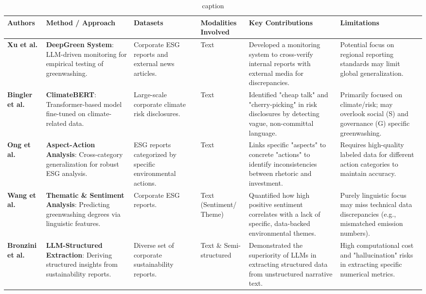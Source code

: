 \begin{landscape}
\begin{table}[p]
\centering
\caption{caption}
\label{label}
\small
\renewcommand{\arraystretch}{1.2}
\begin{tabularx}{\linewidth}{|p{1.8cm}|X|X|p{1.8cm}|X|X|}
\hline
Authors & Method / Approach & Datasets & Modalities Involved & Key Contributions & Limitations \\ \hline
\textbf{Xu et al.}  \parencite{chong_xu_bff21576} & \textbf{DeepGreen System}: LLM-driven monitoring for empirical testing of greenwashing. & Corporate ESG reports and external news articles. & Text & Developed a monitoring system to cross-verify internal reports with external media for discrepancies. & Potential focus on regional reporting standards may limit global generalization. \\ \hline
\textbf{Bingler et al.}  \parencite{julia_bingler_268445e3} & \textbf{ClimateBERT}: Transformer-based model fine-tuned on climate-related data. & Large-scale corporate climate risk disclosures. & Text & Identified "cheap talk" and "cherry-picking" in risk disclosures by detecting vague, non-committal language. & Primarily focused on climate/risk; may overlook social (S) and governance (G) specific greenwashing. \\ \hline
\textbf{Ong et al.}  \parencite{keane_ong_369a0b63} & \textbf{Aspect-Action Analysis}: Cross-category generalization for robust ESG analysis. & ESG reports categorized by specific environmental actions. & Text & Links specific "aspects" to concrete "actions" to identify inconsistencies between rhetoric and investment. & Requires high-quality labeled data for different action categories to maintain accuracy. \\ \hline
\textbf{Wang et al.}  \parencite{xiaojia_wang_02351a60} & \textbf{Thematic \& Sentiment Analysis}: Predicting greenwashing degrees via linguistic features. & Corporate ESG reports. & Text (Sentiment/ Theme) & Quantified how high positive sentiment correlates with a lack of specific, data-backed environmental themes. & Purely linguistic focus may miss technical data discrepancies (e.g., mismatched emission numbers). \\ \hline
\textbf{Bronzini et al.}  \parencite{marco_bronzini_bf94d949} & \textbf{LLM-Structured Extraction}: Deriving structured insights from sustainability reports. & Diverse set of corporate sustainability reports. & Text \& Semi-structured & Demonstrated the superiority of LLMs in extracting structured data from unstructured narrative text. & High computational cost and "hallucination" risks in extracting specific numerical metrics. \\ \hline

\end{tabularx}
\end{table}
\end{landscape}
